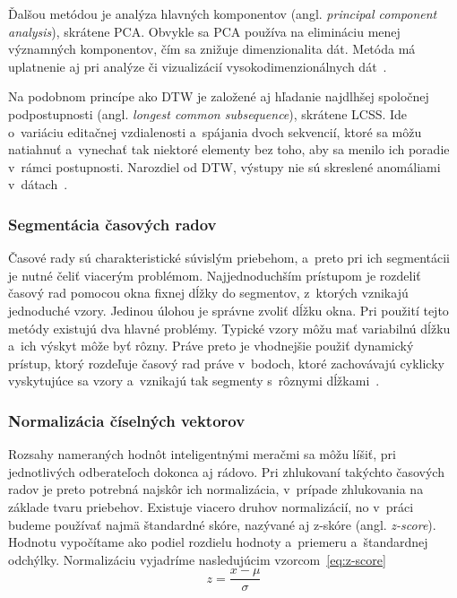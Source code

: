 \documentclass[a4paper,twoside,slovak,12pt,appendix]{article}
\begin{document}
Ďalšou metódou je analýza hlavných komponentov (angl. \textit{principal
component analysis}), skrátene PCA. Obvykle sa PCA používa na elimináciu menej
významných komponentov, čím sa znižuje dimenzionalita dát. Metóda má uplatnenie
aj pri analýze či vizualizácií vysokodimenzionálnych dát~\cite{Fu2011}.

Na podobnom princípe ako DTW je založené aj hľadanie najdlhšej spoločnej
podpostupnosti (angl. \textit{longest common subsequence}), skrátene LCSS. Ide
o~variáciu editačnej vzdialenosti a~spájania dvoch sekvencií, ktoré sa môžu
natiahnuť a~vynechať tak niektoré elementy bez toho, aby sa menilo ich poradie
v~rámci postupnosti. Narozdiel od DTW, výstupy nie sú skreslené anomáliami
v~dátach~\cite{Fu2011}.

\subsubsection{Segmentácia časových radov}
Časové rady sú charakteristické súvislým priebehom, a~preto pri ich segmentácii
je nutné čeliť viacerým problémom. Najjednoduchším prístupom je rozdeliť časový
rad pomocou okna fixnej dĺžky do segmentov, z~ktorých vznikajú jednoduché vzory.
Jedinou úlohou je správne zvoliť dĺžku okna. Pri použití tejto metódy existujú
dva hlavné problémy. Typické vzory môžu mať variabilnú dĺžku a~ich výskyt môže
byť rôzny. Práve preto je vhodnejšie použiť dynamický prístup, ktorý rozdeľuje
časový rad práve v~bodoch, ktoré zachovávajú cyklicky vyskytujúce sa vzory
a~vznikajú tak segmenty s~rôznymi dĺžkami~\cite{Fu2011}.

\subsubsection{Normalizácia číselných vektorov}
\label{c:z-score}
Rozsahy nameraných hodnôt inteligentnými meračmi sa môžu líšiť, pri jednotlivých
odberateľoch dokonca aj rádovo. Pri zhlukovaní takýchto časových radov je preto
potrebná najskôr ich normalizácia, v~prípade zhlukovania na základe tvaru
priebehov. Existuje viacero druhov normalizácií, no v~práci budeme používať
najmä štandardné skóre, nazývané aj z-skóre (angl. \textit{z-score}). Hodnotu
vypočítame ako podiel rozdielu hodnoty a~priemeru a~štandardnej odchýlky.
Normalizáciu vyjadríme nasledujúcim
vzorcom~\ref{eq:z-score}~\cite{Arampatzis2009}
\begin{equation}
	\label{eq:z-score}
  z = \frac{x-\mu}{\sigma}
\end{equation}
\end{document}
